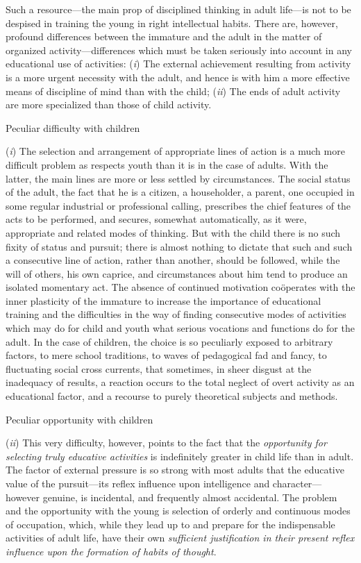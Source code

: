 \documentclass[letterpaper]{book}
\begin{document}
Such a resource---the main prop of disciplined thinking in adult
life---is not to be despised in training the young in right intellectual
habits. There are, however, profound differences between the immature
and
the
adult in the matter of organized activity---differences which must be
taken seriously into account in any educational use of activities:
(\emph{i}) The external achievement resulting from activity is a more
urgent necessity with the adult, and hence is with him a more effective
means of discipline of mind than with the child; (\emph{ii}) The ends of
adult activity are more specialized than those of child activity.

Peculiar difficulty with children

(\emph{i}) The selection and arrangement of appropriate lines of action
is a much more difficult problem as respects youth than it is in the
case of adults. With the latter, the main lines are more or less settled
by circumstances. The social status of the adult, the fact that he is a
citizen, a householder, a parent, one occupied in some regular
industrial or professional calling, prescribes the chief features of the
acts to be performed, and secures, somewhat automatically, as it were,
appropriate and related modes of thinking. But with the child there is
no such fixity of status and pursuit; there is almost nothing to dictate
that such and such a consecutive line of action, rather than another,
should be followed, while the will of others, his own caprice, and
circumstances about him tend to produce an isolated momentary act. The
absence of continued motivation coöperates with the inner plasticity of
the immature to increase the importance of educational training and the
difficulties in the way of finding consecutive modes of activities which
may do for child and youth what serious vocations and functions do for
the adult. In the case of children, the choice is so peculiarly exposed
to arbitrary factors, to mere school traditions, to waves of pedagogical
fad and fancy, to fluctuating social cross currents, that sometimes, in
sheer disgust at the inadequacy of results, a reaction
occurs
to the total neglect of overt activity as an educational factor, and a
recourse to purely theoretical subjects and methods.

Peculiar opportunity with children

(\emph{ii}) This very difficulty, however, points to the fact that the
\emph{opportunity for selecting truly educative activities} is
indefinitely greater in child life than in adult. The factor of external
pressure is so strong with most adults that the educative value of the
pursuit---its reflex influence upon intelligence and character---however
genuine, is incidental, and frequently almost accidental. The problem
and the opportunity with the young is selection of orderly and
continuous modes of occupation, which, while they lead up to and prepare
for the indispensable activities of adult life, have their own
\emph{sufficient justification in their present reflex influence upon
the formation of habits of thought}.
\end{document}
